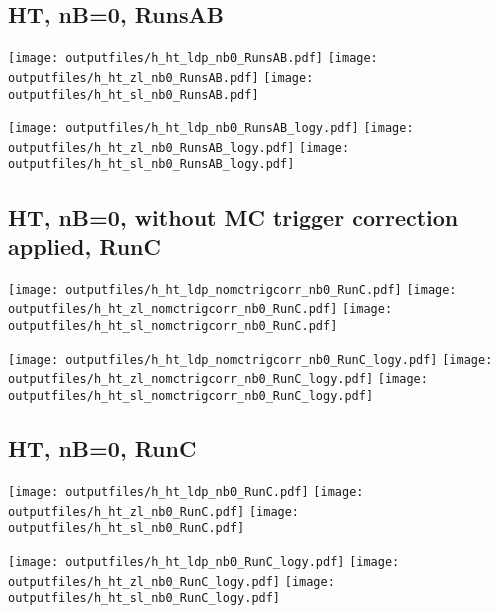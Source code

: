 \documentclass[11pt]{article}
\begin{document}
    \subsection{ HT, nB=0, RunsAB}

    \noindent
    \texttt{[image: outputfiles/h\_ht\_ldp\_nb0\_RunsAB.pdf]}
    \texttt{[image: outputfiles/h\_ht\_zl\_nb0\_RunsAB.pdf]}
    \texttt{[image: outputfiles/h\_ht\_sl\_nb0\_RunsAB.pdf]}

    \noindent
    \texttt{[image: outputfiles/h\_ht\_ldp\_nb0\_RunsAB\_logy.pdf]}
    \texttt{[image: outputfiles/h\_ht\_zl\_nb0\_RunsAB\_logy.pdf]}
    \texttt{[image: outputfiles/h\_ht\_sl\_nb0\_RunsAB\_logy.pdf]}





    \subsection{ HT, nB=0, without MC trigger correction applied, RunC}

    \noindent
    \texttt{[image: outputfiles/h\_ht\_ldp\_nomctrigcorr\_nb0\_RunC.pdf]}
    \texttt{[image: outputfiles/h\_ht\_zl\_nomctrigcorr\_nb0\_RunC.pdf]}
    \texttt{[image: outputfiles/h\_ht\_sl\_nomctrigcorr\_nb0\_RunC.pdf]}

    \noindent
    \texttt{[image: outputfiles/h\_ht\_ldp\_nomctrigcorr\_nb0\_RunC\_logy.pdf]}
    \texttt{[image: outputfiles/h\_ht\_zl\_nomctrigcorr\_nb0\_RunC\_logy.pdf]}
    \texttt{[image: outputfiles/h\_ht\_sl\_nomctrigcorr\_nb0\_RunC\_logy.pdf]}


    \subsection{ HT, nB=0, RunC}

    \noindent
    \texttt{[image: outputfiles/h\_ht\_ldp\_nb0\_RunC.pdf]}
    \texttt{[image: outputfiles/h\_ht\_zl\_nb0\_RunC.pdf]}
    \texttt{[image: outputfiles/h\_ht\_sl\_nb0\_RunC.pdf]}

    \noindent
    \texttt{[image: outputfiles/h\_ht\_ldp\_nb0\_RunC\_logy.pdf]}
    \texttt{[image: outputfiles/h\_ht\_zl\_nb0\_RunC\_logy.pdf]}
    \texttt{[image: outputfiles/h\_ht\_sl\_nb0\_RunC\_logy.pdf]}
\end{document}
